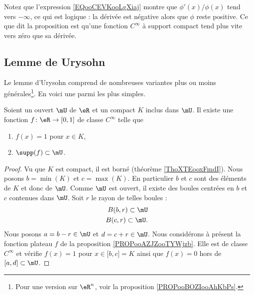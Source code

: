 Notez que l'expression \ref{EQooCEVKooLgXiaj} montre que \( \phi'(x)/\phi(x)\) tend vers \( -\infty\), ce qui est logique : la dérivée est négative alors que \( \phi\) reste positive. Ce que dit la proposition est qu'une fonction \(  C^{\infty}\) à support compact tend plus vite vers zéro que sa dérivée.



\subsection{Lemme de Urysohn}

Le lemme d'Urysohn comprend de nombreuses variantes plus ou moins générales\footnote{Pour une version sur \( \eR^n\), voir la proposition \ref{PROPooBOZIooAhKbPs}.}. En voici une parmi les plus simples.
\begin{lemma}      \label{LEMooECTNooKagaRU}
	Soient un ouvert \( \mU\) de \( \eR\) et un compact \( K\) inclus dans \( \mU\). Il existe une fonction \( f\colon \eR\to \mathopen[ 0 , 1 \mathclose]\) de classe  \(  C^{\infty}\) telle que
	\begin{enumerate}
		\item
		      \( f(x)=1\) pour \( x\in K\),
		\item
		      \( \supp(f)\subset \mU\).
	\end{enumerate}
\end{lemma}

\begin{proof}
	Vu que \( K\) est compact, il est borné (théorème \ref{ThoXTEooxFmdI}). Nous posons \( b=\min(K)\) et \( c=\max(K)\). En particulier \( b\) et \( c\) sont des éléments de \( K\) et donc de \( \mU\). Comme \( \mU\) est ouvert, il existe des boules centrées en \( b\) et \( c\) contenues dans \( \mU\). Soit \( r\) le rayon de telles boules :
	\begin{subequations}
		\begin{align}
			B(b,r)\subset \mU \\
			B(c,r)\subset \mU.
		\end{align}
	\end{subequations}
	Nous posons \( a=b-r\in \mU\) et \( d=c+r\in \mU\). Nous considérons à présent la fonction plateau \( f\) de la proposition \ref{PROPooAZJZooTYWjzb}. Elle est de classe \(  C^{\infty}\) et vérifie \( f(x)=1\) pour \( x\in \mathopen[ b , c \mathclose]=K\) ainsi que \( f(x)=0\) hors de \( \mathopen[ a , d \mathclose]\subset \mU\).
\end{proof}

